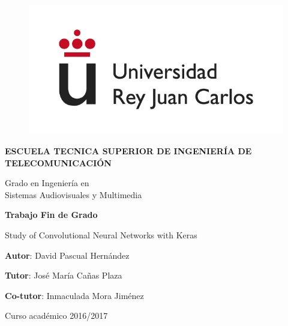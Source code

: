 \begin{titlepage}
	
	\begin{center}
		
		\begin{figure}[htb]
			\begin{center}
				\includegraphics[width=0.6\linewidth]{figures/logo}
			\end{center}
		\end{figure}
		
		\vspace{10mm}
		
		\begin{Large}
			\textbf{ESCUELA TECNICA SUPERIOR DE INGENIERÍA DE TELECOMUNICACIÓN}
			\vspace{10mm}
		\end{Large}
		
		\begin{Large}
			Grado en Ingeniería en\\ \vspace{2mm} Sistemas Audiovisuales y Multimedia
		\end{Large}
		
		\vspace{10mm}
		
		\begin{large}
			\textbf{Trabajo Fin de Grado}
		\end{large}
		\vspace{25mm}
		
		\begin{huge}
			Study of Convolutional Neural Networks with Keras
		\end{huge}
		
		\vspace{25mm}
		
		\begin{large}
			\textbf{Autor}: David Pascual Hernández
			
			\textbf{Tutor}: José María Cañas Plaza
			
			\textbf{Co-tutor}: Inmaculada Mora Jiménez 
			
			\vspace{10mm}
			
			Curso académico 2016/2017
		\end{large}
		
		\vspace{10mm}
		
	\end{center}
	
\end{titlepage}


